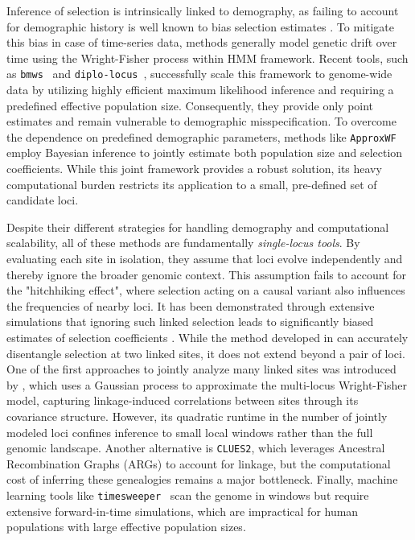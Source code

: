 \documentclass{article}
\newcommand{\ApproxWF}{\texttt{ApproxWF}\xspace}
\newcommand{\diplolocus}{\texttt{diplo-locus}\xspace}
\newcommand{\bmws}{\texttt{bmws}\xspace}
\newcommand{\CLUES}{\texttt{CLUES2}\xspace}
\newcommand{\timesweeper}{\texttt{timesweeper}\xspace}
\begin{document}
Inference of selection is intrinsically linked to demography, as failing to account for demographic history is well known to bias selection estimates \citep{jensen2005,nielsen2005,mughal2019}.
To mitigate this bias in case of time-series data, methods generally model genetic drift over time using the Wright-Fisher process within HMM framework.
Recent tools, such as \bmws~\citep{mathieson2022} and \diplolocus~\citep{cheng2025}, successfully scale this framework to genome-wide data by utilizing highly efficient maximum likelihood inference and requiring a predefined effective population size.
Consequently, they provide only point estimates and remain vulnerable to demographic misspecification.
To overcome the dependence on predefined demographic parameters, methods like \ApproxWF~\citep{ferrer2016} employ Bayesian inference to jointly estimate both population size and selection coefficients.
While this joint framework provides a robust solution, its heavy computational burden restricts its application to a small, pre-defined set of candidate loci.

Despite their different strategies for handling demography and computational scalability, all of these methods are fundamentally \textit{single-locus tools}.
By evaluating each site in isolation, they assume that loci evolve independently and thereby ignore the broader genomic context.
This assumption fails to account for the "hitchhiking effect", where selection acting on a causal variant also influences the frequencies of nearby loci.
It has been demonstrated through extensive simulations that ignoring such linked selection leads to significantly biased estimates of selection coefficients \citep{he2020}.
While the method developed in \citep{he2020} can accurately disentangle selection at two linked sites, it does not extend beyond a pair of loci.
One of the first approaches to jointly analyze many linked sites was introduced by \citet{terhorst2015}, which uses a Gaussian process to approximate the multi-locus Wright-Fisher model, capturing linkage-induced correlations between sites through its covariance structure.
However, its quadratic runtime in the number of jointly modeled loci confines inference to small local windows rather than the full genomic landscape.
Another alternative is \CLUES\citep{vaughn2024}, which leverages Ancestral Recombination Graphs (ARGs) to account for linkage, but the computational cost of inferring these genealogies remains a major bottleneck.
Finally, machine learning tools like \timesweeper~\citep{whitehouse2023} scan the genome in windows but require extensive forward-in-time simulations, which are impractical for human populations with large effective population sizes.
\end{document}
